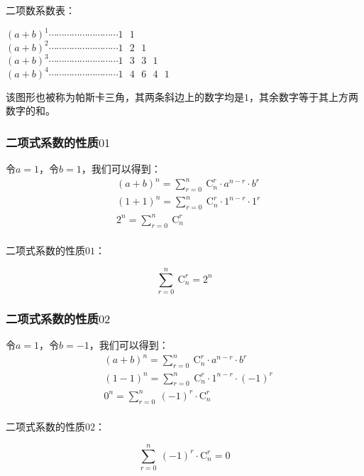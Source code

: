 \documentclass[UTF8]{ctexart}
\begin{document}
    二项数系数表：
    \begin{center}
        $(a+b)^1\cdots\cdots\cdots\cdots\cdots\cdots\cdots\cdots\cdots 1~~~1$\\[1mm]
        $(a+b)^2\cdots\cdots\cdots\cdots\cdots\cdots\cdots\cdots\cdots 1~~~2~~~1$\\[1mm]
        $(a+b)^3\cdots\cdots\cdots\cdots\cdots\cdots\cdots\cdots\cdots 1~~~3~~~3~~~1$\\[1mm]
        $(a+b)^4\cdots\cdots\cdots\cdots\cdots\cdots\cdots\cdots\cdots 1~~~4~~~6~~~4~~~1$\\[1mm]
    \end{center}\vspace{8pt}
    该图形也被称为帕斯卡三角，其两条斜边上的数字均是$1$，其余数字等于其上方两数字的和。

\subsubsection{二项式系数的性质$01$}
    令$a=1$，令$b=1$，我们可以得到：\vspace{5pt}
    \setcounter{equation}{0}
    \begin{align}
        &(a+b)^n=\sum_{r=0}^{n}~\mathrm{C}_n^r\cdot a^{n-r}\cdot b^r\\[3mm]
        &(1+1)^n=\sum_{r=0}^{n}~\mathrm{C}_n^r\cdot 1^{n-r}\cdot 1^r\\[3mm]
        &2^n=\sum_{r=0}^{n}~\mathrm{C}_n^r
    \end{align}\\
    二项式系数的性质$01$：
    \begin{large}
        \begin{equation*}
            \sum_{r=0}^{n}~\mathrm{C}_n^r=2^n
        \end{equation*}
    \end{large}

\subsubsection{二项式系数的性质$02$}
    令$a=1$，令$b=-1$，我们可以得到：\vspace{5pt}
    \setcounter{equation}{0}
    \begin{align}
        &(a+b)^n=\sum_{r=0}^{n}~\mathrm{C}_n^r\cdot a^{n-r}\cdot b^r\\[3mm]
        &(1-1)^n=\sum_{r=0}^{n}~\mathrm{C}_n^r\cdot 1^{n-r}\cdot (-1)^r\\[3mm]
        &0^n=\sum_{r=0}^{n}~(-1)^r\cdot\mathrm{C}_n^r
    \end{align}\\
    二项式系数的性质$02$：
    \begin{large}
        \begin{equation*}
            \sum_{r=0}^{n}~(-1)^r\cdot\mathrm{C}_n^r=0
        \end{equation*}
    \end{large}
\end{document}
